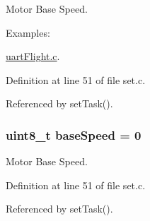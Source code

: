 Motor Base Speed. 

\begin{Desc}
\item[Examples\-: ]\par
\hyperlink{uart_flight_8c-example}{uart\-Flight.\-c}.\end{Desc}


Definition at line 51 of file set.\-c.



Referenced by set\-Task().

\hypertarget{group__set_gab2b0c78a81e045d7a8f28be307b8c61b}{
\subsubsection[{base\-Speed}]{\setlength{\rightskip}{0pt plus 5cm}uint8\-\_\-t base\-Speed = 0}}\label{group__set_gab2b0c78a81e045d7a8f28be307b8c61b}


Motor Base Speed. 



Definition at line 51 of file set.\-c.



Referenced by set\-Task().

